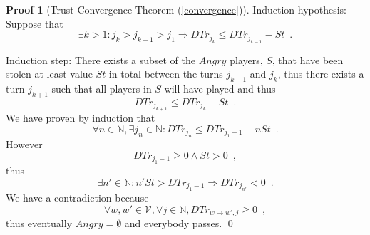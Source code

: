 \documentclass[11pt]{llncs}
\theoremstyle{definition}
\newtheorem{sepproof}{Proof}
\begin{document}
\begin{sepproof}[Trust Convergence Theorem (\ref{convergence})]
       Induction hypothesis: Suppose that
       \begin{equation*}
          \exists k > 1 : j_k > j_{k-1} > j_1 \Rightarrow DTr_{j_k} \leq DTr_{j_{k-1}} - St \enspace.
       \end{equation*}

       Induction step: There exists a subset of the $Angry$ players, $S$, that have been stolen at least value $St$ in total
       between the turns $j_{k-1}$ and $j_k$, thus there exists a turn $j_{k+1}$ such that all players in $S$ will have
       played and thus
       \begin{equation*}
          DTr_{j_{k+1}} \leq DTr_{j_k} - St \enspace.
       \end{equation*}
       We have proven by induction that
       \begin{equation*}
          \forall n \in \mathbb{N}, \exists j_n \in \mathbb{N} : DTr_{j_n} \leq DTr_{j_1-1} - nSt \enspace.
       \end{equation*}
       However
       \begin{equation*}
          DTr_{j_1-1} \geq 0 \wedge St > 0 \enspace,
       \end{equation*}
       thus
       \begin{equation*}
          \exists n' \in \mathbb{N} : n'St > DTr_{j_1-1} \Rightarrow DTr_{j_{n'}} < 0 \enspace.
       \end{equation*}
       We have a contradiction because
       \begin{equation*}
          \forall w,w' \in \mathcal{V}, \forall j \in \mathbb{N}, DTr_{w \rightarrow w', j} \geq 0 \enspace,
       \end{equation*}
       thus eventually $Angry = \emptyset$ and everybody passes. \qed
    \end{sepproof}
\end{document}
